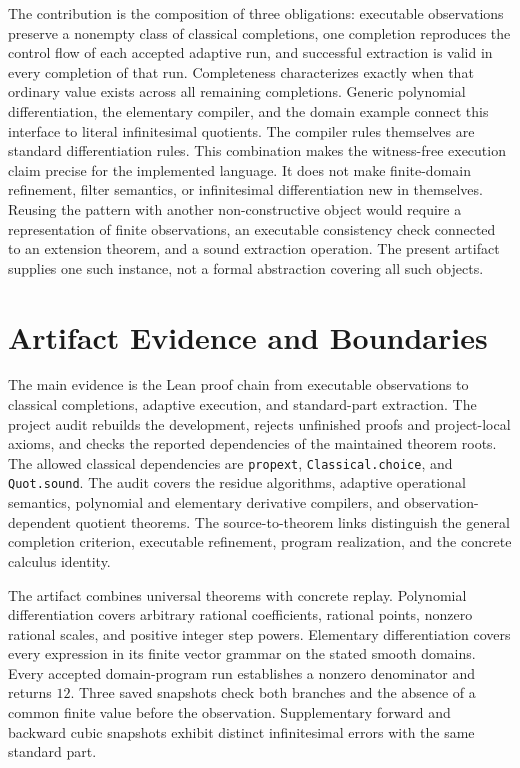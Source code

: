 \documentclass[11pt,a4paper]{article}
\theoremstyle{result}
\theoremstyle{definition}
\newcommand{\code}[1]{\texttt{#1}}
\begin{document}
The contribution is the composition of three obligations: executable observations preserve a nonempty class of classical completions, one completion reproduces the control flow of each accepted adaptive run, and successful extraction is valid in every completion of that run. Completeness characterizes exactly when that ordinary value exists across all remaining completions. Generic polynomial differentiation, the elementary compiler, and the domain example connect this interface to literal infinitesimal quotients. The compiler rules themselves are standard differentiation rules. This combination makes the witness-free execution claim precise for the implemented language. It does not make finite-domain refinement, filter semantics, or infinitesimal differentiation new in themselves. Reusing the pattern with another non-constructive object would require a representation of finite observations, an executable consistency check connected to an extension theorem, and a sound extraction operation. The present artifact supplies one such instance, not a formal abstraction covering all such objects.

\section{Artifact Evidence and Boundaries}\label{sec:evaluation}

The main evidence is the Lean proof chain from executable observations to classical completions, adaptive execution, and standard-part extraction. The project audit rebuilds the development, rejects unfinished proofs and project-local axioms, and checks the reported dependencies of the maintained theorem roots. The allowed classical dependencies are \code{propext}, \code{Classical.choice}, and \code{Quot.sound}. The audit covers the residue algorithms, adaptive operational semantics, polynomial and elementary derivative compilers, and observation-dependent quotient theorems. The source-to-theorem links distinguish the general completion criterion, executable refinement, program realization, and the concrete calculus identity.

The artifact combines universal theorems with concrete replay. Polynomial differentiation covers arbitrary rational coefficients, rational points, nonzero rational scales, and positive integer step powers. Elementary differentiation covers every expression in its finite vector grammar on the stated smooth domains. Every accepted domain-program run establishes a nonzero denominator and returns $12$. Three saved snapshots check both branches and the absence of a common finite value before the observation. Supplementary forward and backward cubic snapshots exhibit distinct infinitesimal errors with the same standard part.
\end{document}
